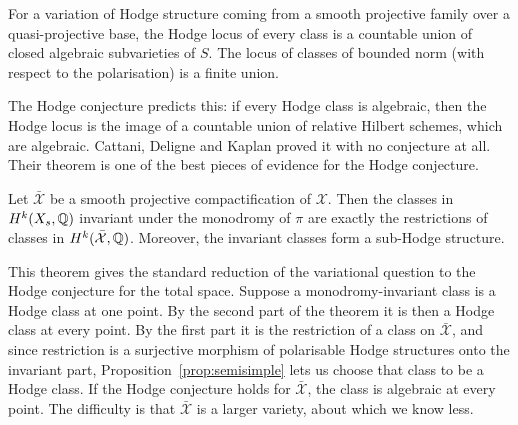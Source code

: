 \begin{theorem}\label{thm:cdk}
For a variation of Hodge structure coming from a smooth projective family
over a quasi-projective base, the Hodge locus of every class is a countable
union of closed algebraic subvarieties of $S$. The locus of classes of
bounded norm (with respect to the polarisation) is a finite union.
\end{theorem}

The Hodge conjecture predicts this: if every Hodge class is algebraic, then
the Hodge locus is the image of a countable union of relative Hilbert
schemes, which are algebraic. Cattani, Deligne and Kaplan proved it with no
conjecture at all. Their theorem is one of the best pieces of evidence for
the Hodge conjecture.

\begin{theorem}\label{thm:invcycles}
Let $\bar{\mathcal X}$ be a smooth projective compactification of
$\mathcal X$. Then the classes in $H^{k}(X_{s},\mathbb{Q})$ invariant under the
monodromy of $\pi$ are exactly the restrictions of classes in
$H^{k}(\bar{\mathcal X},\mathbb{Q})$. Moreover, the invariant classes form a
sub-Hodge structure.
\end{theorem}

This theorem gives the standard reduction of the variational question to
the Hodge conjecture for the total space. Suppose a monodromy-invariant
class is a Hodge class at one point. By the second part of the theorem it
is then a Hodge class at every point. By the first part it is the
restriction of a class on $\bar{\mathcal X}$, and since restriction is a
surjective morphism of polarisable Hodge structures onto the invariant
part, Proposition~\ref{prop:semisimple} lets us choose that class to be a
Hodge class. If the Hodge conjecture
holds for $\bar{\mathcal X}$, the class is algebraic at every point. The
difficulty is that $\bar{\mathcal X}$ is a larger variety, about which we
know less.
